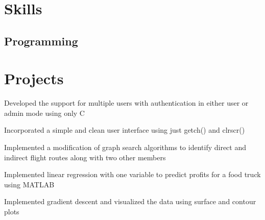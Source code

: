\documentclass[]{deedy-resume-openfont}
\begin{document}
\begin{minipage}[t]{0.64\textwidth}


\section{Skills}
\subsection{Programming}



\sectionsep


\section{Projects}

\vspace{\topsep} %
\begin{tightemize}
\item Developed the support for multiple users with authentication in either user or admin mode using only C
\item Incorporated a simple and clean user interface using just getch() and clrscr()
\item Implemented a modification of graph search algorithms to identify direct and indirect flight routes along with two other members
\end{tightemize}
\sectionsep

\begin{tightemize}
\item Implemented linear regression with one variable to predict profits for a food truck using MATLAB
\item Implemented gradient descent and visualized the data using surface and contour plots
\end{tightemize}
\sectionsep



\end{minipage}
\end{document}
